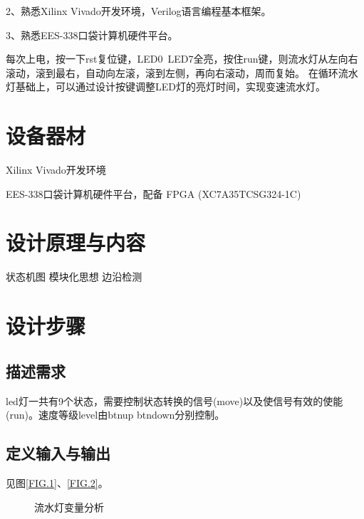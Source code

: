 \documentclass[UTF8]{article}
\begin{document}
2、熟悉Xilinx Vivado开发环境，Verilog语言编程基本框架。

3、熟悉EES-338口袋计算机硬件平台。

每次上电，按一下rst复位键，LED0~LED7全亮，按住run键，则流水灯从左向右滚动，滚到最右，自动向左滚，滚到左侧，再向右滚动，周而复始。
在循环流水灯基础上，可以通过设计按键调整LED灯的亮灯时间，实现变速流水灯。


\section{设备器材}
Xilinx Vivado开发环境

EES-338口袋计算机硬件平台，配备 FPGA (XC7A35TCSG324-1C)

\section{设计原理与内容}

状态机图
模块化思想
边沿检测


\section{设计步骤}
\subsection{描述需求}

led灯一共有9个状态，需要控制状态转换的信号(move)以及使信号有效的使能(run)。速度等级level由btnup btndown分别控制。

\subsection{定义输入与输出}

见图\ref{FIG.1}、\ref{FIG.2}。

\begin{figure}[H]
    \centering
    \caption{流水灯变量分析}
\end{figure}
\end{document}
